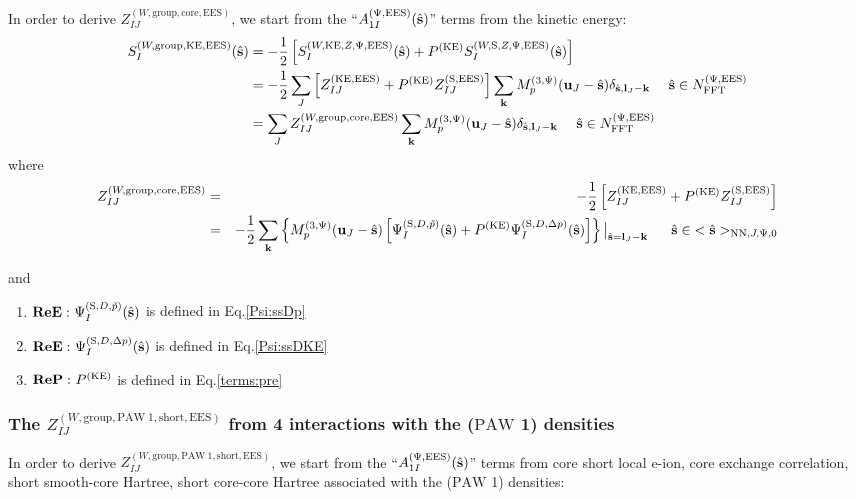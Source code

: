 \documentclass[paper=a4, fontsize=11pt]{article} %
\numberwithin{equation}{section} %
\numberwithin{figure}{section} %
\numberwithin{table}{section} %
\newcommand{\bu}{{\bf{u}}}
\newcommand{\bl}{{\bf{l}}}
\newcommand{\bk}{{\bf{k}}}
\newcommand{\bs}{{\bf{s}}}
\newcommand{\hs}{{\hat{\bf{s}}}}
\newcommand{\rS}{{\mathrm{S}}}
\newcommand{\rKE}{{\mathrm{KE}}}
\newcommand{\rEES}{{\mathrm{EES}}}
\newcommand{\rgr}{{\mathrm{group}}}
\newcommand{\rcore}{{\mathrm{core}}}
\newcommand{\rNN}{{\mathrm{NN}}}
\newcommand{\rshort}{{\mathrm{short}}}
\newcommand{\rP}{{\mathrm{PAW}}}
\newcommand{\NFFTpEES}{{N^{\mathrm{(\Psi,\rEES})}_{\mathrm{FFT}}}}
\newcommand{\Mp}{{M_p^{(3,\Psi)}}}
\newcommand{\hsJpzr}{{<\hs>_{\rNN,J,\Psi,0}}}
\newcommand{\hsinJpzr}{{\ \ \ \ \ \hs  \in  \hsJpzr}}
\newcommand{\hsinpEES}{{\ \ \ \ \hs \in \NFFTpEES}}
\newcommand{\ReE}{{{\bf ReE:\ }}}
\newcommand{\ReP}{{{\bf ReP:\ }}}
\begin{document}
In order to derive $Z_{IJ}^{(W,\rgr,\rcore,\rEES)}$, we start from the ``$A_{1I}^{(\Psi,\rEES)}(\hs) $'' terms from the kinetic energy:
\begin{equation}
\begin{split}   
S_I^{(W,\rgr,\rKE,\rEES)}(\hat \bs)
&= -\frac{ 1}{2}\left[S_I^{(W,\rKE,Z,\Psi,\rEES)}(\hs) + P^{(\rKE)}S_I^{(W,\rS,Z,\Psi,\rEES)}(\hs)\right] \\
&= -\frac{1}{2}\sum_J \left[Z_{IJ} ^{(\rKE,\rEES)} +  P^{(\rKE)} Z_{IJ} ^{(\rS,\rEES)} \right]\sum_{\bk} \Mp(\bu_{J}-\hat \bs) \delta_{\hat \bs,\bl_J-\bk} \hsinpEES \\
&= \sum_J Z_{IJ}^{(W,\rgr,\rcore,\rEES)} \sum_{\bk} \Mp(\bu_{J}-\hat \bs) \delta_{\hat \bs,\bl_J-\bk} \hsinpEES 
\end{split}
\end{equation}
where
\begin{eqnarray}
\label{FIJ:ZIJ}
Z_{IJ}^{(W,\rgr,\rcore,\rEES)}
&=& -\frac{1}{2} \left[Z_{IJ} ^{(\rKE,\rEES)} +  P^{(\rKE)} Z_{IJ} ^{(\rS,\rEES)} \right]\\
&=& -\frac{1}{2} \sum_{\bk} \left\{ \Mp(\bu_{J}-\hat \bs) \left[\Psi_I^{(\rS,D,\tilde p)}(\hs) + P^{(\rKE)} \Psi_I^{(\rS,D,\Delta p)}(\hs)\right]\right\}\big|_{\hat \bs=\bl_J-\bk}  \hsinJpzr\nonumber
\\
\end{eqnarray}

and
\begin{enumerate}
\item $\ReE \Psi_I^{(\rS,D,\tilde p)}(\hs)$ is defined in Eq.\eqref{Psi:ssDp}
\item $\ReE \Psi_I^{(\rS,D,\Delta p)}(\hs)$ is defined in Eq.\eqref{Psi:ssDKE}
\item $\ReP P^{(\rKE)}$ is defined in Eq.\eqref{terms:pre}
\end{enumerate}



\subsubsection{The $Z_{IJ}^{(W,\rgr,\rP\ 1,\rshort,\rEES)}$ from 4 interactions with the ($\rP$ 1) densities}

In order to derive $Z_{IJ}^{(W,\rgr,\rP\ 1,\rshort,\rEES)}$, we start from the ``$A_{1I}^{(\Psi,\rEES)}(\hs) $'' terms from core short local e-ion, core exchange correlation, short smooth-core Hartree, short core-core Hartree associated with the ($\rP$ 1) densities:
\end{document}
